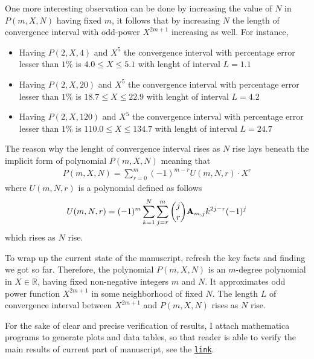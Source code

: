 One more interesting observation can be done by increasing the value of $N$ in $P(m, X, N)$ having fixed $m$, it
follows that by increasing $N$ the length of convergence interval with odd-power $X^{2m+1}$ increasing as well.
For instance,
\begin{itemize}
    \item Having $P(2, X, 4)$ and $X^5$ the convergence interval with percentage error lesser than $1\%$ is $4.0 \leq X \leq 5.1$ with lenght of interval $L=1.1$
    \item Having $P(2, X, 20)$ and $X^5$ the convergence interval with percentage error lesser than $1\%$ is $18.7 \leq X \leq 22.9$ with lenght of interval $L=4.2$
    \item Having $P(2, X, 120)$ and $X^5$ the convergence interval with percentage error lesser than $1\%$ is $110.0 \leq X \leq 134.7$ with lenght of interval $L=24.7$
\end{itemize}
The reason why the lenght of convergence interval rises as $N$ rise lays beneath the implicit form of polynomial $P(m,X,N)$
meaning that
\begin{align*}
    P(m,X,N) = \sum_{r=0}^{m} (-1)^{m-r} U(m, N, r) \cdot X^{r}
\end{align*}
where $U(m, N, r)$ is a polynomial defined as follows
\begin{align*}
    U(m, N, r) = (-1)^m \sum_{k=1}^{N} \sum_{j=r}^{m} \binom{j}{r} {\mathbf{A}} \sb{m,j} k^{2j-r} (-1)^j
\end{align*}
which rises as $N$ rise.

To wrap up the current state of the manuscript, refresh the key facts and finding we got so far.
Therefore, the polynomial $P(m,X,N)$ is an $m$-degree polynomial in $X \in \mathbb{R}$, having fixed non-negative
integers $m$ and $N$.
It approximates odd power function $X^{2m+1}$ in some neighborhood of fixed $N$.
The length $L$ of convergence interval between $X^{2m+1}$ and $P(m,X,N)$ rises as $N$ rise.

For the sake of clear and precise verification of results, I attach mathematica programs to generate
plots and data tables, so that reader is able to verify the main results of current part of manuscript,
see the \href{https://gist.github.com/kolosovpetro/2b5c55094c66b8d6a97b9798be9a8dec}{\texttt{link}}.

